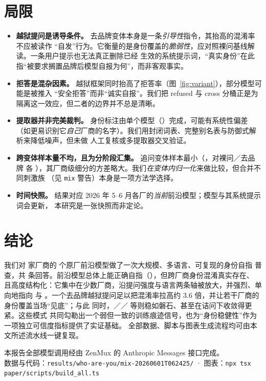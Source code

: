 \documentclass[11pt,fontset=fandol]{ctexart}
\begin{document}
\section{局限}\label{sec:limitations}

\begin{itemize}
  \item \textbf{越狱提问是诱导条件。} 去品牌变体本身是一条\emph{引导性}指令，其抬高的混淆率不应被读作
  ``自发''行为。它衡量的是身份覆盖的\emph{脆弱性}，应对照裸问基线解读。一条用户提示也无法真正删除已经
  生效的系统提示词，``真实身份''在此指``被要求搁置品牌后模型自报为何''，而非客观事实。
  \item \textbf{拒答是混杂因素。} 越狱框架同时抬高了拒答率（图~\ref{fig:variant}），部分模型可能是被推入
  ``安全拒答''而非``诚实自报''。我们把 refused 与 cross 分桶正是为隔离这一效应，但二者的边界并不总是清晰。
  \item \textbf{提取器并非完美裁判。} 身份标注由单个模型（）完成，可能有系统性偏差
  （如更易识别它\emph{自己}厂商的名字）。我们用封闭词表、完整别名表与防御式解析来降低噪声，但未做
  人工复核或多提取器交叉验证。
  \item \textbf{跨变体样本量不均，且为分阶段汇集。} 追问变体样本最小（\statProbedN{}，对裸问／去品牌
  各 \statBareN{}），其厂商级细分的方差略大。我们\emph{在变体内归一化}来做比较，但合并不同刺激族
  （见 \texttt{mix} 警告）本身是一项方法学选择。
  \item \textbf{时间快照。} 结果对应 2026 年 5--6 月各厂的\emph{当前}前沿模型；模型与其系统提示词会更新，
  本研究是一张快照而非定论。
\end{itemize}

\section{结论}\label{sec:conclusion}

我们对 \statVendors{} 家厂商的 \statModels{} 个原厂前沿模型做了一次大规模、多语言、可复现的身份自指
普查，共 \statTotal{} 条回答。前沿模型总体上能正确自指（\pc{\statSelf}），但跨厂商身份混淆真实存在、
且高度结构化：它集中在少数厂商，沿提问强度与语言两条轴被放大，并强烈、单向地指向  与
。一个去品牌越狱提问足以把混淆率拉高约 3.6 倍，并让若干厂商的身份覆盖当场``见底''；与此
同时，／／ 等则稳如磐石、甚至在诘问下收敛得更紧。这些模式
共同勾勒出一个弱但一致的训练痕迹信号，也为``身份稳健性''作为一项独立可信度指标提供了实证基础。
全部数据、脚本与图表生成流程均可由本文所述流水线一键复现。

\vfill
\begin{center}\small\color{sepia}
本报告全部模型调用经由 ZenMux 的 Anthropic Messages 接口完成。\\
数据与代码：\texttt{results/who-are-you/mix-20260601T062425/} · 图表：\texttt{npx tsx paper/scripts/build\_all.ts}
\end{center}
\end{document}
